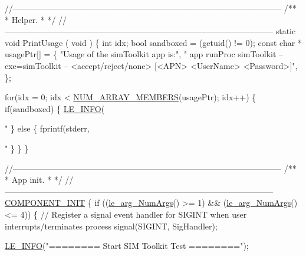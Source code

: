 \begin{DoxyCodeInclude}
{{{{\textcolor{comment}{//--------------------------------------------------------------------------------------------------}\textcolor{comment}{}
\textcolor{comment}{/**}
\textcolor{comment}{ * Helper.}
\textcolor{comment}{ *}
\textcolor{comment}{ */}
\textcolor{comment}{//--------------------------------------------------------------------------------------------------}
\textcolor{keyword}{static} \textcolor{keywordtype}{void} PrintUsage
(
    \textcolor{keywordtype}{void}
)
\{
    \textcolor{keywordtype}{int} idx;
    \textcolor{keywordtype}{bool} sandboxed = (getuid() != 0);
    \textcolor{keyword}{const} \textcolor{keywordtype}{char} * usagePtr[] =
    \{
            \textcolor{stringliteral}{"Usage of the simToolkit app is:"},
            \textcolor{stringliteral}{"   app runProc simToolkit --exe=simToolkit -- <accept/reject/none> [<APN> <UserName>
       <Password>]"},
    \};

    \textcolor{keywordflow}{for}(idx = 0; idx < \hyperlink{le__basics_8h_a8d8f28a045f43b477cafb67a99894c07}{NUM\_ARRAY\_MEMBERS}(usagePtr); idx++)
    \{
        \textcolor{keywordflow}{if}(sandboxed)
        \{
            \hyperlink{le__log_8h_a23e6d206faa64f612045d688cdde5808}{LE\_INFO}(\textcolor{stringliteral}{"%
        \}
        \textcolor{keywordflow}{else}
        \{
            fprintf(stderr, \textcolor{stringliteral}{"%
        \}
    \}
\}

\textcolor{comment}{//--------------------------------------------------------------------------------------------------}\textcolor{comment}{}
\textcolor{comment}{/**}
\textcolor{comment}{ * App init.}
\textcolor{comment}{ *}
\textcolor{comment}{ */}
\textcolor{comment}{//--------------------------------------------------------------------------------------------------}
\hyperlink{le__event_loop_8h_abdb9187a56836a93d19cc793cbd4b7ec}{COMPONENT\_INIT}
\{
    \textcolor{keywordflow}{if} ((\hyperlink{le__args_8h_a6fbbeb423104e6eb92fe47ef42b7310a}{le\_arg\_NumArgs}() >= 1) && (\hyperlink{le__args_8h_a6fbbeb423104e6eb92fe47ef42b7310a}{le\_arg\_NumArgs}() <= 4))
    \{
        \textcolor{comment}{// Register a signal event handler for SIGINT when user interrupts/terminates process}
        signal(SIGINT, SigHandler);

        \hyperlink{le__log_8h_a23e6d206faa64f612045d688cdde5808}{LE\_INFO}(\textcolor{stringliteral}{"======== Start SIM Toolkit Test ========"});

}}}}}}
\end{DoxyCodeInclude}
